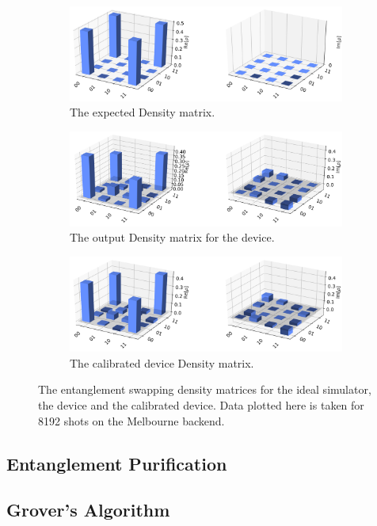 \begin{figure}
	\begin{subfigure}{.5\textwidth} \centering %
		\includegraphics[width=.8\linewidth]{images/results/swap_density_sim.png}
		\caption{The expected Density matrix.}
		\label{fig:swap_density_sim}
	\end{subfigure} \newline
	\begin{subfigure}{.5\textwidth} \centering %
		\includegraphics[width=.8\linewidth]{images/results/swap_density_dev.png}
		\caption{The output Density matrix for the device.}
		\label{fig:swap_density_dev}
	\end{subfigure} \newline
	\begin{subfigure}{.5\textwidth} \centering %
		\includegraphics[width=.8\linewidth]{images/results/swap_density_cal.png}
		\caption{The calibrated device Density matrix.}
		\label{fig:swap_density_dev}
	\end{subfigure}
	\caption{ The entanglement swapping density matrices for the ideal simulator,
the device and the calibrated device. Data plotted here is taken for 8192 shots
on the Melbourne backend. }
	\label{fig:swap_density}
\end{figure}

\subsection{Entanglement Purification}
\subsection{Grover's Algorithm}


